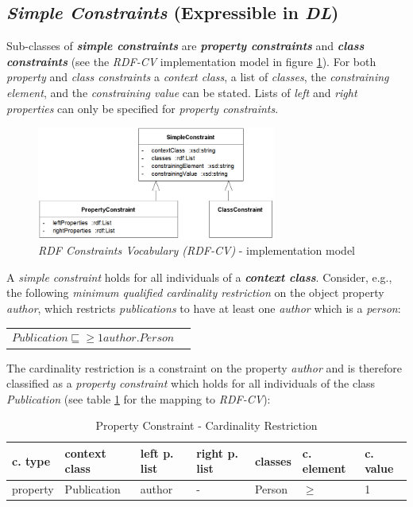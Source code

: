 \documentclass{llncs}
\newenvironment{DL}{
  \vspace{0cm}
	\begin{center}
  \begin{tabular}{r l}

}{
  \end{tabular}
	\end{center}
}
\begin{document}
\subsection{\emph{Simple Constraints} (Expressible in \emph{DL})}

Sub-classes of \textbf{\emph{simple constraints}} are \textbf{\emph{property constraints}} and \textbf{\emph{class constraints}} (see the \emph{RDF-CV} implementation model in figure \ref{fig:RDF-CV-implementation-model}). 
For both \emph{property} and \emph{class constraints} a \emph{context class}, a list of \emph{classes}, the \emph{constraining element}, and the \emph{constraining value} can be stated. 
Lists of \emph{left} and \emph{right properties} can only be specified for \emph{property constraints}.

\begin{figure}
	\centering
		\includegraphics[width=0.70\textwidth]{images/RDF-CV-implementation-model.png}
	\caption{\emph{RDF Constraints Vocabulary (RDF-CV)} - implementation model}
	\label{fig:RDF-CV-implementation-model}
\end{figure}

A \emph{simple constraint} holds for all individuals of a \textbf{\emph{context class}}.
Consider, e.g., the following \emph{minimum qualified cardinality restriction} on the object property \emph{author}, which restricts \emph{publications} to have at least one \emph{author} which is a \emph{person}: 
\begin{DL}
$Publication \sqsubseteq \geq1 author . Person $
\end{DL}
The cardinality restriction is a constraint on the property \emph{author} and is therefore classified as a \emph{property constraint} which holds for all individuals of the class \emph{Publication} (see table \ref{tab:property-constraint-cardinality-restriction} for the mapping to \emph{RDF-CV}):

\begin{table}
  \scriptsize
  \sffamily
  \vspace{0cm}
	\centering
		\begin{tabular}{l|l|l|l|l|l|l}
      \textbf{c. type} & \textbf{context class} & \textbf{left p. list} & \textbf{right p. list} & \textbf{classes} & \textbf{c. element} & \textbf{c. value} \\
      \hline
      property & Publication & author & - & Person & $\geq$ & 1 \\
		\end{tabular}
	\caption{Property Constraint - Cardinality Restriction}
	\label{tab:property-constraint-cardinality-restriction}
\end{table}
\end{document}
